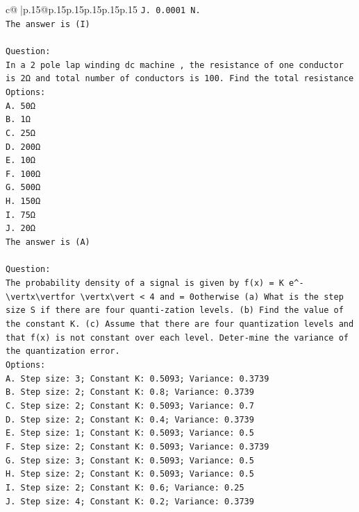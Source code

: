 \documentclass{article}
\begin{document}
{\begin{supertabular}{c@{$\;$}|p{.15\linewidth}@{}p{.15\linewidth}p{.15\linewidth}p{.15\linewidth}p{.15\linewidth}p{.15\linewidth}}
{{{\texttt{J. 0.0001 N.} \\
\texttt{The answer is (I)} \\
\\ 
\texttt{Question:} \\
\texttt{In a 2 pole lap winding dc machine , the resistance of one conductor is 2Ω and total number of conductors is 100. Find the total resistance} \\
\texttt{Options:} \\
\texttt{A. 50Ω} \\
\texttt{B. 1Ω} \\
\texttt{C. 25Ω} \\
\texttt{D. 200Ω} \\
\texttt{E. 10Ω} \\
\texttt{F. 100Ω} \\
\texttt{G. 500Ω} \\
\texttt{H. 150Ω} \\
\texttt{I. 75Ω} \\
\texttt{J. 20Ω} \\
\texttt{The answer is (A)} \\
\\ 
\texttt{Question:} \\
\texttt{The probability density of a signal is given by f(x) = K e\^{}{-}\textbackslash{}vertx\textbackslash{}vertfor \textbackslash{}vertx\textbackslash{}vert < 4 and = 0otherwise (a) What is the step size S if there are four quanti{-}zation levels. (b) Find the value of the constant K. (c) Assume that there are four quantization levels and that f(x) is not constant over each level. Deter{-}mine the variance of the quantization error.} \\
\texttt{Options:} \\
\texttt{A. Step size: 3; Constant K: 0.5093; Variance: 0.3739} \\
\texttt{B. Step size: 2; Constant K: 0.8; Variance: 0.3739} \\
\texttt{C. Step size: 2; Constant K: 0.5093; Variance: 0.7} \\
\texttt{D. Step size: 2; Constant K: 0.4; Variance: 0.3739} \\
\texttt{E. Step size: 1; Constant K: 0.5093; Variance: 0.5} \\
\texttt{F. Step size: 2; Constant K: 0.5093; Variance: 0.3739} \\
\texttt{G. Step size: 3; Constant K: 0.5093; Variance: 0.5} \\
\texttt{H. Step size: 2; Constant K: 0.5093; Variance: 0.5} \\
\texttt{I. Step size: 2; Constant K: 0.6; Variance: 0.25} \\
\texttt{J. Step size: 4; Constant K: 0.2; Variance: 0.3739} \\
            }
        }
    }
     \\ \\


\end{supertabular}}
\end{document}
